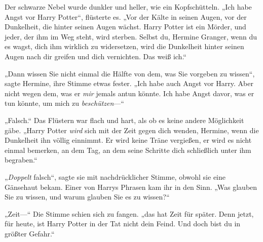 Der schwarze Nebel wurde dunkler und heller, wie ein Kopfschütteln. „Ich habe Angst vor Harry Potter“, flüsterte es. „Vor der Kälte in seinen Augen, vor der Dunkelheit, die hinter seinen Augen wächst. Harry Potter ist ein Mörder, und jeder, der ihm im Weg steht, wird sterben. Selbst du, Hermine Granger, wenn du es wagst, dich ihm wirklich zu widersetzen, wird die Dunkelheit hinter seinen Augen nach dir greifen und dich vernichten. Das weiß ich.“

„Dann wissen Sie nicht einmal die Hälfte von dem, was Sie vorgeben zu wissen“, sagte Hermine, ihre Stimme etwas fester. „Ich habe auch Angst vor Harry. Aber nicht wegen dem, was er \emph{mir} jemals antun könnte. Ich habe Angst davor, was er tun könnte, um mich zu \emph{beschützen}—“

„Falsch.“ Das Flüstern war flach und hart, als ob es keine andere Möglichkeit gäbe. „Harry Potter \emph{wird} sich mit der Zeit gegen dich wenden, Hermine, wenn die Dunkelheit ihn völlig einnimmt. Er wird keine Träne vergießen, er wird es nicht einmal bemerken, an dem Tag, an dem seine Schritte dich schließlich unter ihm begraben.“

„\emph{Doppelt} falsch“, sagte sie mit nachdrücklicher Stimme, obwohl sie eine Gänsehaut bekam. Einer von Harrys Phrasen kam ihr in den Sinn. „Was glauben Sie zu wissen, und warum glauben Sie es zu wissen?“

„Zeit—“ Die Stimme schien sich zu fangen. „das hat Zeit für später. Denn jetzt, für heute, ist Harry Potter in der Tat nicht dein Feind. Und doch bist du in größter Gefahr.“

